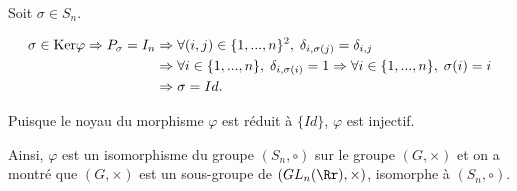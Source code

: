 {\begin{enumerate}
{Soit $\sigma\in S_n$.

\begin{align*}\ensuremath
\sigma\in\mbox{Ker}\varphi\Rightarrow P_\sigma=I_n&\Rightarrow\forall(i,j)\in\{1,...,n\}^2,\;\delta_{i,\sigma(j)}=\delta_{i,j}\\
 &\Rightarrow \forall i\in\{1,...,n\},\;\delta_{i,\sigma(i)}=1\Rightarrow\forall i\in\{1,...,n\},\;\sigma(i)=i\\
 &\Rightarrow\sigma=Id.
\end{align*}

Puisque le noyau du morphisme $\varphi$ est réduit à $\{Id\}$, $\varphi$ est injectif.

Ainsi, $\varphi$ est un isomorphisme du groupe $(S_n,\circ)$ sur le groupe $(G,\times)$ et on a montré que $(G,\times)$ est un sous-groupe de $(GL_n(\Rr),\times)$, isomorphe à $(S_n,\circ)$.}
\end{enumerate}
}

